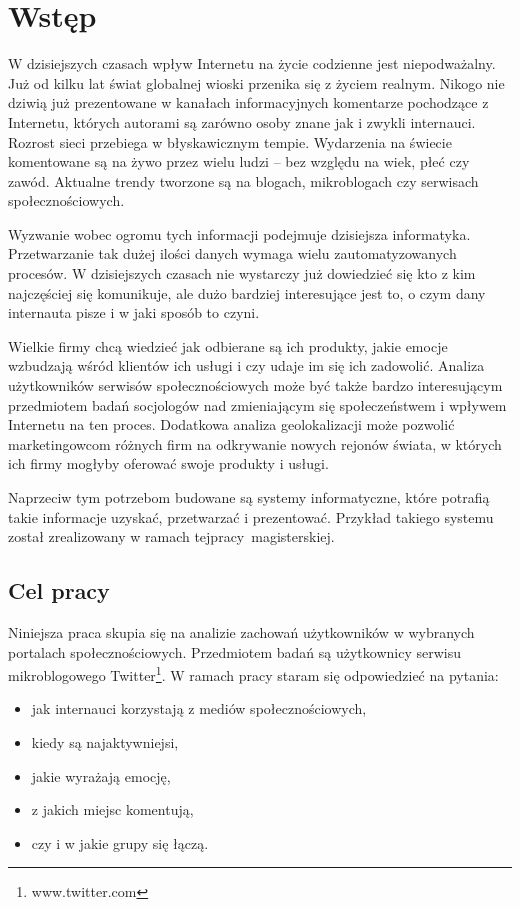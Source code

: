 \chapter{Wstęp}
\label{sec:wstęp}
W dzisiejszych czasach wpływ Internetu na życie codzienne jest niepodważalny.
Już od kilku lat świat globalnej wioski przenika się z życiem realnym.
Nikogo nie dziwią już prezentowane w kanałach informacyjnych komentarze
pochodzące z Internetu, których autorami są zarówno osoby znane jak i zwykli
internauci.  Rozrost sieci przebiega w błyskawicznym tempie.
Wydarzenia na świecie komentowane są na żywo przez wielu ludzi -- bez względu na
wiek, płeć czy zawód. Aktualne trendy tworzone są na blogach, mikroblogach czy
serwisach społecznościowych.

Wyzwanie wobec ogromu tych informacji podejmuje dzisiejsza informatyka.
Przetwarzanie tak dużej ilości danych wymaga wielu zautomatyzowanych procesów.
W dzisiejszych czasach nie wystarczy już dowiedzieć się kto z kim najczęściej
się komunikuje, ale dużo bardziej interesujące jest to, o czym dany internauta
pisze i w jaki sposób to czyni.

Wielkie firmy chcą wiedzieć jak odbierane są ich produkty, jakie emocje
wzbudzają wśród klientów ich usługi i czy udaje im się ich zadowolić.
Analiza użytkowników serwisów społecznościowych może być także bardzo
interesującym przedmiotem badań socjologów nad zmieniającym się społeczeństwem i
wpływem Internetu na ten proces.
Dodatkowa analiza geolokalizacji może pozwolić marketingowcom różnych firm na
odkrywanie nowych rejonów świata, w których ich firmy mogłyby oferować swoje
produkty i usługi.

Naprzeciw tym potrzebom budowane są systemy informatyczne, które potrafią takie
informacje uzyskać, przetwarzać i prezentować. Przykład takiego systemu został
zrealizowany w ramach tej\linebreak pracy~magisterskiej.

\section{Cel pracy}
Niniejsza praca skupia się na analizie zachowań użytkowników w wybranych
portalach społecznościowych. Przedmiotem badań są użytkownicy serwisu
mikroblogowego Twitter\footnote{www.twitter.com}. W ramach pracy staram się
odpowiedzieć na pytania:
\begin{itemize}
  \item jak internauci korzystają z mediów społecznościowych,
  \item kiedy są najaktywniejsi,
  \item jakie wyrażają emocję,
  \item z jakich miejsc komentują,
  \item czy i w jakie grupy się łączą.
\end{itemize}

